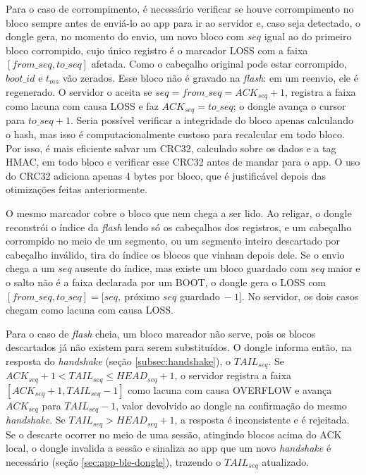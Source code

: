 \documentclass[
	12pt,
	article,			%
	oneside,
	a4paper,
	english,
	brazil				%
	]{abntex2}
\begin{document}
Para o caso de corrompimento, é necessário verificar se houve corrompimento no bloco sempre antes de enviá-lo ao app para ir ao servidor e, caso seja detectado, o dongle gera, no momento do envio,
um novo bloco com $seq$ igual ao do primeiro bloco corrompido, cujo único registro é o marcador LOSS com a faixa $[from\_seq, to\_seq]$ afetada. Como o cabeçalho original pode estar corrompido,
$boot\_id$ e $t_{ms}$ vão zerados. Esse bloco não é gravado na \textit{flash}: em um reenvio, ele é regenerado. O servidor o aceita se $seq = from\_seq = ACK_{seq} + 1$, registra a faixa como lacuna
com causa LOSS e faz $ACK_{seq} = to\_seq$; o dongle avança o cursor para $to\_seq + 1$. Seria possível verificar a integridade do bloco apenas calculando o hash, mas isso é computacionalmente custoso
para recalcular em todo bloco. Por isso, é mais eficiente salvar um CRC32, calculado sobre os dados e a tag HMAC, em todo bloco e verificar esse CRC32 antes de mandar para o app. O uso do CRC32 adiciona apenas 4 bytes por
bloco, que é justificável depois das otimizações feitas anteriormente.

O mesmo marcador cobre o bloco que nem chega a ser lido. Ao religar, o dongle reconstrói o índice da \textit{flash} lendo só os cabeçalhos dos registros, e um cabeçalho corrompido no meio de
um segmento, ou um segmento inteiro descartado por cabeçalho inválido, tira do índice os blocos que vinham depois dele. Se o envio chega a um $seq$ ausente do índice, mas existe um bloco guardado
com $seq$ maior e o salto não é a faixa declarada por um BOOT, o dongle gera o LOSS com $[from\_seq, to\_seq] = [seq,\ $próximo $seq$ guardado$\ - 1]$. No servidor, os dois casos chegam como
lacuna com causa LOSS.

Para o caso de \textit{flash} cheia, um bloco marcador não serve, pois os blocos descartados já não existem para serem substituídos. O dongle informa então, na resposta do \textit{handshake} (seção
\ref{subsec:handshake}), o $TAIL_{seq}$. Se $ACK_{seq} + 1 < TAIL_{seq} \leq HEAD_{seq} + 1$, o servidor registra a faixa $[ACK_{seq} + 1, TAIL_{seq} - 1]$ como lacuna com causa OVERFLOW e avança
$ACK_{seq}$ para $TAIL_{seq} - 1$, valor devolvido ao dongle na confirmação do mesmo \textit{handshake}. Se $TAIL_{seq} > HEAD_{seq} + 1$, a resposta é inconsistente e é rejeitada. Se o descarte
ocorrer no meio de uma sessão, atingindo blocos acima do ACK local, o dongle invalida a sessão e sinaliza ao app que um novo \textit{handshake} é necessário (seção \ref{sec:app-ble-dongle}), trazendo
o $TAIL_{seq}$ atualizado.
\end{document}
